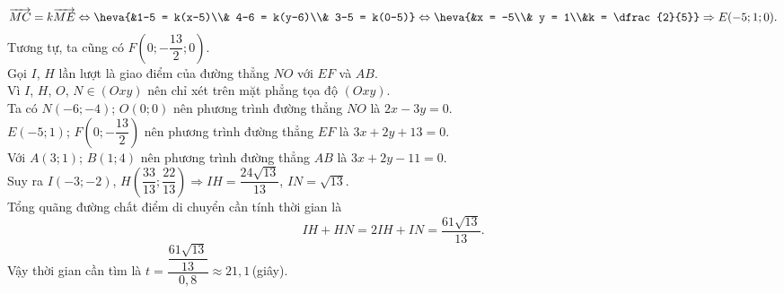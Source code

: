 \begin{ex}
{		\begin{eqnarray*}
			\overrightarrow{MC} = k\overrightarrow{ME} \Leftrightarrow \heva{&1-5 = k(x-5)\\& 4-6 = k(y-6)\\& 3-5 = k(0-5)} \Leftrightarrow \heva{&x = -5\\& y = 1\\&k = \dfrac{2}{5}} \Rightarrow E(-5;1;0).
		\end{eqnarray*}
		Tương tự, ta cũng có $F(0;-\dfrac{13}{2};0)$.\\
		Gọi $I$, $H$ lần lượt là giao điểm của đường thẳng $NO$ với $EF$ và $AB$.\\
		Vì $I$, $H$, $O$, $N \in (Oxy)$ nên chỉ xét trên mặt phẳng tọa độ $(Oxy)$.\\
		Ta có $N(-6;-4)$; $O(0;0)$ nên phương trình đường thẳng $NO$ là $2x - 3y = 0$.\\
		$E(-5;1)$; $F\left(0;-\dfrac{13}{2}\right)$ nên phương trình đường thẳng $EF$ là $3x + 2y + 13 = 0$.\\
		Với $A(3;1)$; $B(1;4)$ nên phương trình đường thẳng $AB$ là $3x + 2y - 11 = 0$.\\
		Suy ra $I(-3;-2)$, $H\left(\dfrac{33}{13};\dfrac{22}{13}\right) \Rightarrow IH = \dfrac{24\sqrt{13}}{13}$, $IN = \sqrt{13}$.\\
		Tổng quãng đường chất điểm di chuyển cần tính thời gian là
		$$IH + HN = 2IH + IN = \dfrac{61\sqrt{13}}{13}.$$
		Vậy thời gian cần tìm là $t = \dfrac{\dfrac{61\sqrt{13}}{13}}{0{,}8}  \approx 21{,}1$\,(giây).
	}
\end{ex}

